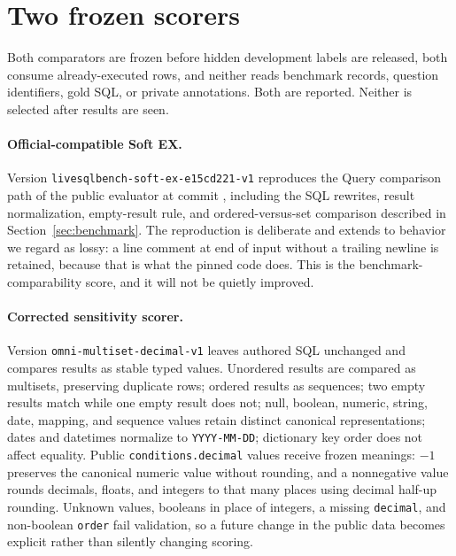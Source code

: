 \section{Two frozen scorers}
\label{sec:scoring}

Both comparators are frozen before hidden development labels are released, both
consume already-executed rows, and neither reads benchmark records, question
identifiers, gold SQL, or private annotations. Both are reported. Neither is
selected after results are seen.

\paragraph{Official-compatible Soft EX.}
Version \texttt{livesqlbench-soft-ex-e15cd221-v1} reproduces the Query
comparison path of the public evaluator at commit
, including the SQL rewrites,
result normalization, empty-result rule, and ordered-versus-set comparison
described in Section~\ref{sec:benchmark}. The reproduction is deliberate and
extends to behavior we regard as lossy: a line comment at end of input without a
trailing newline is retained, because that is what the pinned code does. This is
the benchmark-comparability score, and it will not be quietly improved.

\paragraph{Corrected sensitivity scorer.}
Version \texttt{omni-multiset-decimal-v1} leaves authored SQL unchanged and
compares results as stable typed values. Unordered results are compared as
multisets, preserving duplicate rows; ordered results as sequences; two empty
results match while one empty result does not; null, boolean, numeric, string,
date, mapping, and sequence values retain distinct canonical representations;
dates and datetimes normalize to \texttt{YYYY-MM-DD}; dictionary key order does
not affect equality. Public \texttt{conditions.decimal} values receive frozen
meanings: $-1$ preserves the canonical numeric value without rounding, and a
nonnegative value rounds decimals, floats, and integers to that many places using
decimal half-up rounding. Unknown values, booleans in place of integers, a
missing \texttt{decimal}, and non-boolean \texttt{order} fail validation, so a
future change in the public data becomes explicit rather than silently changing
scoring.

